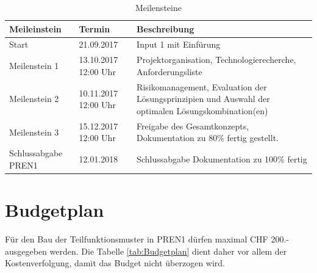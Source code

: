 \documentclass[a4paper]{report}
\begin{document}
\begin{table}[h!]
\vspace{1em}
\noindent
\begin{tabular}{|p{}|p{}|p{}|}
	\hline
	\textbf{Meileinstein} & \textbf{Termin} & \textbf{Beschreibung} \\
	\hline
	Start & 21.09.2017 & Input 1 mit Einfürung \\
	\hline
	Meilenstein 1 & 13.10.2017 12:00 Uhr & Projektorganisation, Technologierecherche, Anforderungsliste \\
	\hline
	Meilenstein 2 & 10.11.2017 12:00 Uhr & Risikomanagement, Evaluation der Lösungsprinzipien und Auswahl der optimalen Lösungskombination(en) \\
	\hline
	Meilenstein 3 & 15.12.2017 12:00 Uhr & Freigabe des Gesamtkonzepts, Dokumentation zu 80\% fertig gestellt. \\
	\hline
	Schlussabgabe PREN1 &12.01.2018 & Schlussabgabe Dokumentation zu 100\% fertig \\
	\hline
	\end{tabular}
	\caption{Meilensteine}
	\label{tab:Meilensteine}
\end{table}

\newpage

\section{Budgetplan}
\label{sec:Budgetplan}
Für den Bau der Teilfunktionsmuster in PREN1 dürfen maximal CHF 200.- ausgegeben werden. Die Tabelle \ref{tab:Budgetplan} dient daher vor allem der Kostenverfolgung, damit das Budget nicht überzogen wird.
\end{document}
